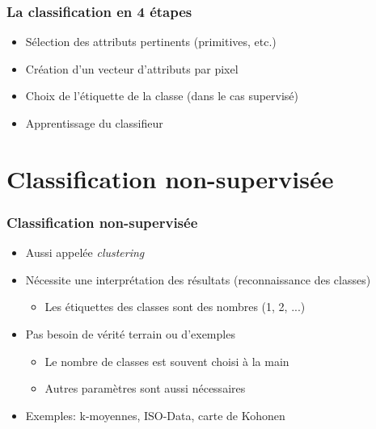 \documentclass[compress]{beamer}
\begin{document}
\begin{frame}
  \frametitle{La classification en 4 étapes}
  \begin{itemize}
  \item Sélection des attributs pertinents (primitives, etc.)
  \item Création d'un vecteur d'attributs par pixel
  \item Choix de l'étiquette de la classe (dans le cas supervisé)
  \item Apprentissage du classifieur
  \end{itemize}
\end{frame}
\section[Non-supervisé]{Classification non-supervisée}
\label{sec:unsupervised}
\begin{frame}
\frametitle{Classification non-supervisée}
  \begin{itemize}
  \item Aussi appelée {\em clustering}
  \item Nécessite une interprétation des résultats (reconnaissance des
    classes)
    \begin{itemize}
    \item Les étiquettes des classes sont des nombres (1, 2, ...)
    \end{itemize}
  \item Pas besoin de vérité terrain ou d'exemples
    \begin{itemize}
    \item Le nombre de classes est souvent choisi à la main
    \item Autres paramètres sont aussi nécessaires
    \end{itemize}
  \item Exemples: k-moyennes, ISO-Data, carte de Kohonen
  \end{itemize}
\end{frame}
\end{document}
